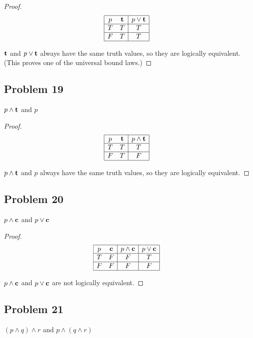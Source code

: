 \documentclass[14pt]{extarticle}
\newcommand{\true}{{\bf t}}
\newcommand{\false}{{\bf c}}
\begin{document}
\begin{proof}
$$
\begin{array}{|cc|c|}
\hline
p & \true & p \vee \true \\
\hline
T & T & T \\
\hline
F & T & T \\
\hline
\end{array}
$$

$\true$ and $p \vee \true$ always have the same truth values, so they are
logically equivalent. (This proves one of the universal bound laws.)

\end{proof}

\subsection{Problem 19}
$p \wedge \true$ and $p$

\begin{proof}
$$
\begin{array}{|cc|c|}
\hline
p & \true & p \wedge \true \\
\hline
T & T & T \\
\hline
F & T & F \\
\hline
\end{array}
$$

$p \wedge \true$ and $p$ always have the same truth values, so they are
logically equivalent.
\end{proof}

\subsection{Problem 20}
$p \wedge \false$ and $p \vee \false$

\begin{proof}
$$
\begin{array}{|cc|c|c|}
\hline
p & \false & p \wedge \false & p \vee \false \\
\hline
T & F & F & T \\
\hline
F & F & F & F \\
\hline
\end{array}
$$

$p \wedge \false$ and $p \vee \false$ are not logically equivalent.
\end{proof}

\subsection{Problem 21}
$(p \wedge q) \wedge r$ and $p \wedge (q \wedge r)$
\end{document}
